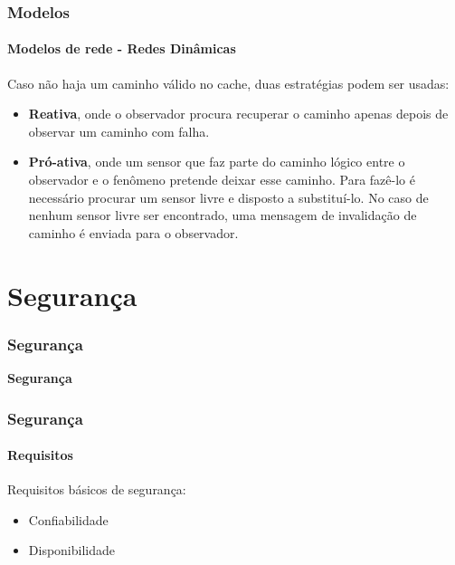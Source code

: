 \documentclass[notes]{beamer}
\begin{document}
\begin{frame}
\frametitle{Modelos}
\framesubtitle{Modelos de rede - Redes Dinâmicas}

\begin{block}

Caso não haja um caminho válido no cache, duas estratégias podem ser usadas: \pause

\begin{itemize}

\item \textbf{Reativa}, onde o observador procura recuperar o caminho apenas depois de observar um caminho com falha. \pause

\item \textbf{Pró-ativa}, onde um sensor que faz parte do caminho lógico entre o observador e o fenômeno pretende deixar esse caminho. Para fazê-lo é necessário procurar um sensor livre e disposto a substituí-lo. No caso de nenhum sensor livre ser encontrado, uma mensagem de invalidação de caminho é enviada para o observador. 

\end{itemize}

\end{block}

\end{frame}

\section{Segurança}

\begin{frame}
\frametitle{Segurança}

\begin{block}

 \center \textbf{Segurança}

\end{block}

\end{frame}

\begin{frame}
\frametitle{Segurança}
\framesubtitle{Requisitos}

\begin{block}

Requisitos básicos de segurança: \pause

\begin{itemize}

\item Confiabilidade \pause
\item Disponibilidade

\end{itemize}

\end{block} \pause

\end{frame}
\end{document}
